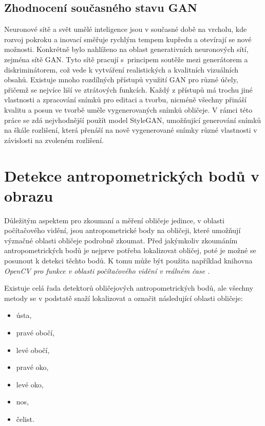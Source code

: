 \subsection*{Zhodnocení současného stavu GAN}

Neuronové sítě a svět umělé inteligence jsou v současné době na vrcholu, kde rozvoj pokroku a inovací směřuje rychlým tempem kupředu a otevírají se nové možnosti. Konkrétně bylo nahlíženo na oblast generativních neuronových sítí, zejména sítě GAN. Tyto sítě pracují s~principem soutěže mezi generátorem a diskriminátorem, což vede k vytváření realistických a kvalitních vizuálních obsahů. Existuje mnoho rozdílných přístupů využití GAN pro různé účely, přičemž se nejvíce liší ve ztrátových funkcích. Každý z přístupů má trochu jiné vlastnosti a zpracování snímků pro editaci a tvorbu, nicméně všechny přináší kvalitu a posun ve tvorbě uměle vygenerovaných snímků obličeje. V rámci této práce se zdá nejvhodnější použít model StyleGAN, umožňující generování snímků na škále rozlišení, která přenáší na nově vygenerované snímky různé vlastnosti v závislosti na zvoleném rozlišení.

\section{Detekce antropometrických bodů v obrazu}

Důležitým aspektem pro zkoumaní a měření obličeje jedince, v oblasti počítačového vidění, jsou antropometrické body na obličeji, které umožňují význačné oblasti obličeje podrobně zkoumat.
Před jakýmkoliv zkoumáním antropometrických bodů je nejprve potřeba lokalizovat obličej, poté je možné se posunout k detekci těchto bodů. K tomu může být použita například knihovna \it OpenCV \rm pro funkce v oblasti počítačového vidění v reálném čase \cite{pyLandmarks}.

Existuje celá řada detektorů obličejových antropometrických bodů, ale všechny metody se v podstatě snaží lokalizovat a označit následující oblasti obličeje:

\begin{itemize}
    \item ústa,
    \item pravé obočí,
    \item levé obočí,
    \item pravé oko,
    \item levé oko,
    \item nos,
    \item čelist.
\end{itemize}


